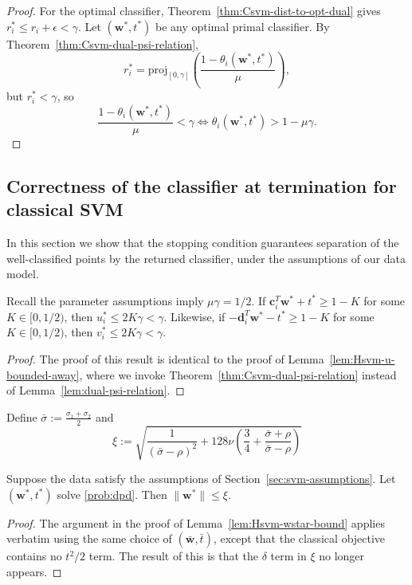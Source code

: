 \documentclass[twoside,11pt]{article}
\newcommand\proj{\mathrm{proj}}
\renewcommand{\c}{\bm{c}}
\renewcommand{\d}{\bm{d}}
\newcommand\w{\bm{w}}
\begin{document}
\begin{proof}
For the optimal classifier, Theorem~\ref{thm:Csvm-dist-to-opt-dual} gives $r_i^* \leq r_i+\epsilon < \gamma$. Let $(\w^*,t^*)$ be any optimal primal classifier. By Theorem~\ref{thm:Csvm-dual-psi-relation},
\[
    r_i^* = \proj_{[0,\gamma]}\left(\frac{1-\theta_i(\w^*,t^*)}{\mu}\right),
\]
but $r_i^* < \gamma$, so
\[
\frac{1-\theta_i(\w^*,t^*)}{\mu} < \gamma \iff \theta_i(\w^*,t^*) > 1 - \mu\gamma.
\]
\end{proof}

\subsection{Correctness of the classifier at termination for classical SVM} \label{sec:svm-correctness}    
In this section we show that the stopping condition guarantees separation of the well-classified points by the returned classifier, under the assumptions of our data model.

\begin{lemma} \label{lem:Csvm-u-bounded-away}
  Recall the parameter assumptions imply $\mu\gamma = 1/2$. If $\c_i^T\w^* + t^* \geq 1 - K$ for some $K \in [0,1/2)$, then $u_i^* \leq 2K\gamma < \gamma$. Likewise,
  if $-\d_i^T\w^* - t^* \geq 1 - K$ for some $K \in [0,1/2)$, then $v_i^* \leq 2K\gamma < \gamma$.
\end{lemma}
\begin{proof}
  The proof of this result is identical to the proof of Lemma~\ref{lem:Hsvm-u-bounded-away}, where we invoke Theorem~\ref{thm:Csvm-dual-psi-relation} instead of Lemma~\ref{lem:dual-psi-relation}.
\end{proof}

Define $\bar{\sigma} := \frac{\sigma_1 + \sigma_2}{2}$ and
\[
    \xi := \sqrt{\frac{1}{(\bar{\sigma} - \rho)^2} + 128\nu\left(\frac{3}{4} + \frac{\bar{\sigma} + \rho}{\bar{\sigma} - \rho}\right)}
\]

\begin{lemma} \label{lem:Csvm-wstar-bound}
  Suppose the data satisfy the assumptions of Section~\ref{sec:svm-assumptions}. Let $(\w^*,t^*)$ solve \eqref{prob:dpd}. Then $\|\w^*\| \leq \xi$.
\end{lemma}
\begin{proof}
    The argument in the proof of Lemma~\ref{lem:Hsvm-wstar-bound} applies verbatim using the same choice of $(\bar{\w},\bar{t})$, except that the classical objective contains no $t^2/2$ term. The result of this is that the $\delta$ term in $\xi$ no longer appears.
\end{proof}
\end{document}
